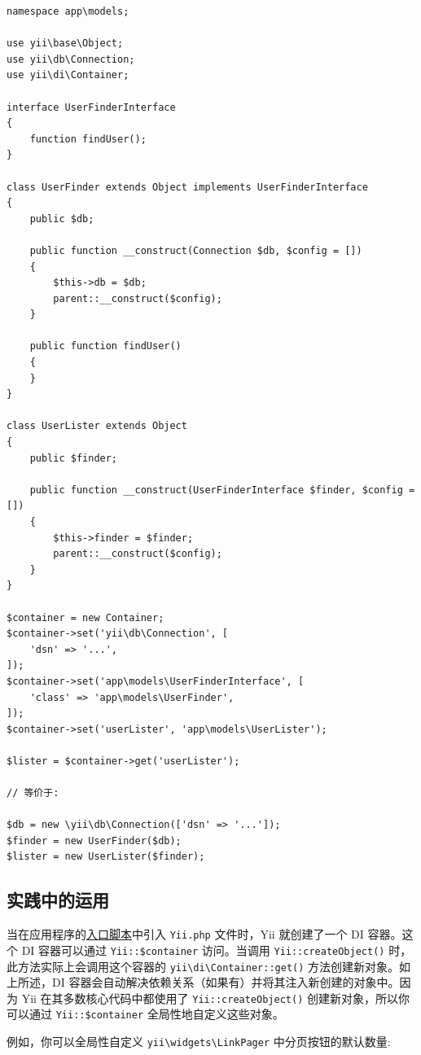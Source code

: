 \lstset{language=php}\begin{lstlisting}
namespace app\models;

use yii\base\Object;
use yii\db\Connection;
use yii\di\Container;

interface UserFinderInterface
{
    function findUser();
}

class UserFinder extends Object implements UserFinderInterface
{
    public $db;

    public function __construct(Connection $db, $config = [])
    {
        $this->db = $db;
        parent::__construct($config);
    }

    public function findUser()
    {
    }
}

class UserLister extends Object
{
    public $finder;

    public function __construct(UserFinderInterface $finder, $config = [])
    {
        $this->finder = $finder;
        parent::__construct($config);
    }
}

$container = new Container;
$container->set('yii\db\Connection', [
    'dsn' => '...',
]);
$container->set('app\models\UserFinderInterface', [
    'class' => 'app\models\UserFinder',
]);
$container->set('userLister', 'app\models\UserLister');

$lister = $container->get('userLister');

// 等价于:

$db = new \yii\db\Connection(['dsn' => '...']);
$finder = new UserFinder($db);
$lister = new UserLister($finder);
\end{lstlisting}
\subsection{实践中的运用 \label{concept-di-container.md::practical-usage}}
当在应用程序的\hyperref[structure-entry-scripts.md]{入口脚本}中引入 \lstinline|Yii.php| 文件时，Yii 就创建了一个 DI 容器。这个 DI 容器可以通过 \texttt{Yii\allowbreak{}::\allowbreak{}\$container} 访问。当调用 \texttt{Yii\allowbreak{}::\allowbreak{}createObject()} 时，此方法实际上会调用这个容器的 \texttt{yii{\allowbreak{}\textbackslash}di{\allowbreak{}\textbackslash}Container\allowbreak{}::\allowbreak{}get()} 方法创建新对象。如上所述，DI 容器会自动解决依赖关系（如果有）并将其注入新创建的对象中。因为 Yii 在其多数核心代码中都使用了
\texttt{Yii\allowbreak{}::\allowbreak{}createObject()} 创建新对象，所以你可以通过 \texttt{Yii\allowbreak{}::\allowbreak{}\$container} 全局性地自定义这些对象。

例如，你可以全局性自定义 \texttt{yii{\allowbreak{}\textbackslash}widgets{\allowbreak{}\textbackslash}LinkPager} 中分页按钮的默认数量:

